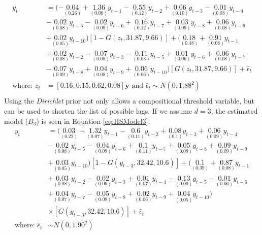 \begin{equation}
\begin{split}
 	y_t &=(-\underset{(0.26)}{0.04}+\underset{(0.08)}{1.36}y_{t-1}-\underset{(0.12)}{0.55}y_{t-2}+\underset{(0.10)}{0.06}y_{t-3}-\underset{(0.08)}{0.01}y_{t-4}\\
 	&-\underset{(0.08)}{0.02}y_{t-5}-\underset{(0.09)}{0.02}y_{t-6}+\underset{(0.12)}{0.16}y_{t-7}+\underset{(0.09)}{0.03}y_{t-8}+\underset{(0.08)}{0.06}y_{t-9}\\
 	&+\underset{(0.05)}{0.02}y_{t-10})[1-G(z_t,31.87,9.66)]+(\underset{(0.48)}{0.18}+\underset{(0.08)}{0.91}y_{t-1}\\
 	&+\underset{(0.08)}{0.02}y_{t-2}-\underset{(0.08)}{0.07}y_{t-3}-\underset{(0.08)}{0.11}y_{t-5}+\underset{(0.06)}{0.01}y_{t-6}+\underset{(0.08)}{0.06}y_{t-7}\\
 	&-\underset{(0.09)}{0.07}y_{t-8}+\underset{(0.08)}{0.04}y_{t-9}+\underset{(0.06)}{0.06}y_{t-10})[G(z_t,31.87,9.66)]+\hat{\epsilon}_t\\
 	\textrm{where: }  z_t&=[0.16,0.15,0.62,0.08]\bm{y} \textrm{ and } \hat{\epsilon}_t \sim N(0, 1.88^2)\\
\end{split}
\label{eq:HSModelDIR}
\end{equation}
Using the \textit{Dirichlet} prior not only allows a compositional threshold variable, but can be used to shorten the list of possible lags. If we assume $d=3$, the estimated model ($B_3$) is seen in Equation \ref{eq:HSModel3}.
\begin{equation}
\begin{split}
 	y_t &=(\underset{(0.22)}{0.03}+\underset{(0.07)}{1.32}y_{t-1}-\underset{(0.11)}{0.6}y_{t-2}+\underset{(0.1)}{0.08}y_{t-3}+\underset{(0.09)}{0.06}y_{t-4}\\
 	&-\underset{(0.08)}{0.02}y_{t-5}-\underset{(0.09)}{0.04}y_{t-6}+\underset{(0.11)}{0.1}y_{t-7}+\underset{(0.09)}{0.05}y_{t-8}+\underset{(0.09)}{0.09}y_{t-9}\\
 	&+\underset{(0.05)}{0.03}y_{t-10})[1-G(y_{t-3},32.42,10.6)]+(\underset{(0.39)}{0.1}+\underset{(0.08)}{0.87}y_{t-1}\\
 	&+\underset{(0.08)}{0.03}y_{t-2}-\underset{(0.06)}{0.02}y_{t-3}+\underset{(0.07)}{0.01}y_{t-4}-\underset{(0.09)}{0.13}y_{t-5}-\underset{(0.06)}{0.01}y_{t-6}\\
 	&+\underset{(0.07)}{0.04}y_{t-7}-\underset{(0.08)}{0.05}y_{t-8}+\underset{(0.06)}{0.02}y_{t-9}+\underset{(0.05)}{0.04}y_{t-10})\\
 	&\times[G(y_{t-3},32.42,10.6)]+\hat{\epsilon}_t\\
 	\textrm{where: } \hat{\epsilon}_t &\sim N(0, 1.90^2)\\
\end{split}
\label{eq:HSModel3}
\end{equation}
